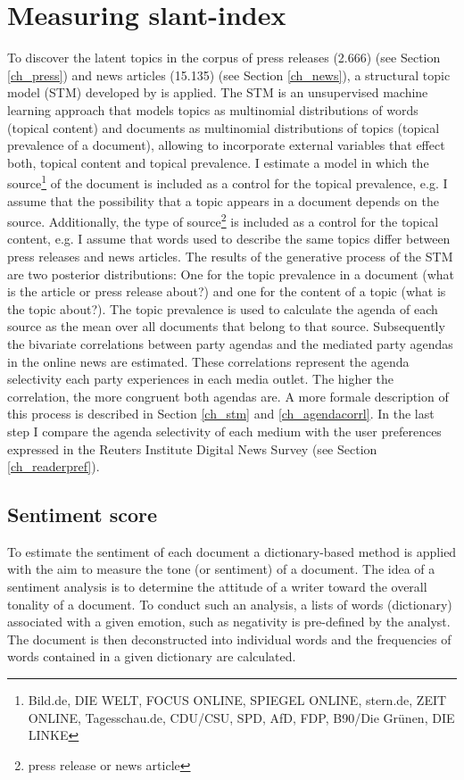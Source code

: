 \documentclass[12pt,a4paper,notitlepage]{article}
\begin{document}
\section{Measuring slant-index}\label{ch_method}

To discover the latent topics in the corpus of press releases (2.666) (see Section \ref{ch_press}) and news articles (15.135) (see Section \ref{ch_news}), a structural topic model (STM) developed by \citet{roberts_model_2016} is applied. The STM is an unsupervised machine learning approach that models topics as multinomial distributions of words (topical content) and documents as multinomial distributions of topics (topical prevalence of a document), allowing to incorporate external variables that effect both, topical content and topical prevalence. I estimate a model in which the source\footnote{Bild.de, DIE WELT, FOCUS ONLINE, SPIEGEL ONLINE, stern.de, ZEIT ONLINE, Tagesschau.de, CDU/CSU, SPD, AfD, FDP, B90/Die Grünen, DIE LINKE} of the document is included as a control for the topical prevalence, e.g. I assume that the possibility that a topic appears in a document depends on the source. Additionally, the type of source\footnote{press release or news article} is included as a control for the topical content, e.g. I assume that words used to describe the same topics differ between press releases and news articles. The results of the generative process of the STM are two posterior distributions: One for the topic prevalence in a document (what is the article or press release about?) and one for the content of a topic (what is the topic about?). The topic prevalence is used to calculate the agenda of each source as the mean over all documents that belong to that source. Subsequently the bivariate correlations between party agendas and the mediated party agendas in the online news are estimated. These correlations represent the agenda selectivity each party experiences in each media outlet. The higher the correlation, the more congruent both agendas are.  A more formale description of this process is described in Section \ref{ch_stm} and \ref{ch_agendacorrl}. In the last step I compare the agenda selectivity of each medium with the user preferences expressed in the Reuters Institute Digital News Survey (see Section \ref{ch_readerpref}). 

\subsection{Sentiment score}

To estimate the sentiment of each document a dictionary-based method is applied with the aim to measure the tone (or sentiment) of a document. The idea of a sentiment analysis is to determine the attitude of a writer toward the overall tonality of a document. To conduct such an analysis, a lists of words (dictionary) associated with a given emotion, such as negativity is pre-defined by the analyst. The document is then deconstructed into individual words and the frequencies of words contained in a given dictionary are calculated. 
\end{document}
